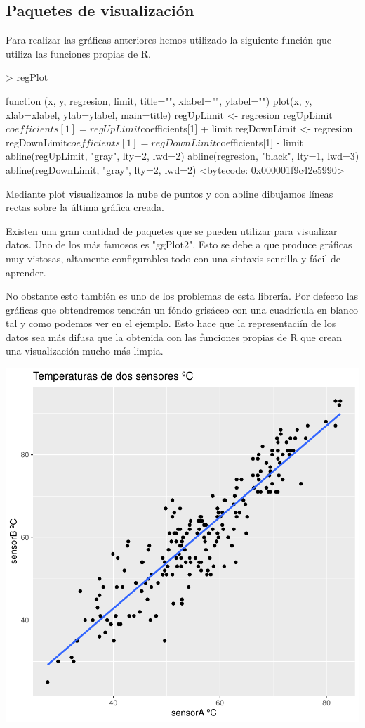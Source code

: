 \documentclass [a4paper] {article}
\begin{document}
\subsection{Paquetes de visualización}
Para realizar las gráficas anteriores hemos utilizado la siguiente función que utiliza las funciones propias de R.
\begin{Schunk}
\begin{Sinput}
> regPlot
\end{Sinput}
\begin{Soutput}
function (x, y, regresion, limit, title="", xlabel="", ylabel="") {
  plot(x, y, xlab=xlabel, ylab=ylabel, main=title)
  regUpLimit <- regresion
  regUpLimit$coefficients[1] = regUpLimit$coefficients[1] + limit
  regDownLimit <- regresion
  regDownLimit$coefficients[1] = regDownLimit$coefficients[1] - limit
  abline(regUpLimit, "gray", lty=2, lwd=2)
  abline(regresion, "black", lty=1, lwd=3)
  abline(regDownLimit, "gray", lty=2, lwd=2)
}
<bytecode: 0x000001f9c42e5990>
\end{Soutput}
\end{Schunk}
Mediante plot visualizamos la nube de puntos y con abline dibujamos líneas rectas sobre la última gráfica creada.

Existen una gran cantidad de paquetes que se pueden utilizar para visualizar datos.
Uno de los más famosos es "ggPlot2".
Esto se debe a que produce gráficas muy vistosas, altamente configurables todo con una sintaxis sencilla y fácil de aprender.

No obstante esto también es uno de los problemas de esta librería.
Por defecto las gráficas que obtendremos tendrán un fóndo grisáceo con una cuadrícula en blanco tal y como podemos ver en el ejemplo.
Esto hace que la representaciín de los datos sea más difusa que la obtenida con las funciones propias de R que crean una visualización mucho más limpia.
\begin{center}
\includegraphics{entrega-ggplot2_NO_se}
\end{center}
\end{document}
